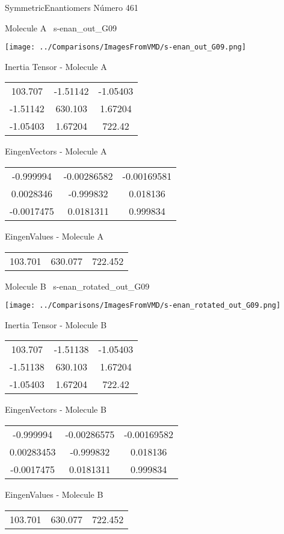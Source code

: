 \vtab[-3cm]
\begin{center}
{\large SymmetricEnantiomers \tab Número 461}
\end{center}
\begin{multicols}{2}
\begin{center}

Molecule A \
s-enan\_out\_G09

\texttt{[image: ../Comparisons/ImagesFromVMD/s-enan\_out\_G09.png]}

Inertia Tensor - Molecule A \\
\begin{tabular}{|c c c|}
103.707	 & 	-1.51142	 & 	-1.05403	 \\
-1.51142	 & 	630.103	 & 	1.67204	 \\
-1.05403	 & 	1.67204	 & 	722.42
\end{tabular}

\vtab
 EingenVectors - Molecule A     \\
\begin{tabular}{|c c c|}
-0.999994	 & 	-0.00286582	 & 	-0.00169581	 \\
0.0028346	 & 	-0.999832	 & 	0.018136	 \\
-0.0017475	 & 	0.0181311	 & 	0.999834
\end{tabular}

\vtab
 EingenValues - Molecule A     \\
\begin{tabular}{|c c c|}
103.701	 & 	630.077	 & 	722.452	 \\
\end{tabular}
\columnbreak

Molecule B \
s-enan\_rotated\_out\_G09

\texttt{[image: ../Comparisons/ImagesFromVMD/s-enan\_rotated\_out\_G09.png]}

Inertia Tensor - Molecule B \\
\begin{tabular}{|c c c|}
103.707	 & 	-1.51138	 & 	-1.05403	 \\
-1.51138	 & 	630.103	 & 	1.67204	 \\
-1.05403	 & 	1.67204	 & 	722.42
\end{tabular}

\vtab
 EingenVectors - Molecule B     \\
\begin{tabular}{|c c c|}
-0.999994	 & 	-0.00286575	 & 	-0.00169582	 \\
0.00283453	 & 	-0.999832	 & 	0.018136	 \\
-0.0017475	 & 	0.0181311	 & 	0.999834
\end{tabular}

\vtab
 EingenValues - Molecule B     \\
\begin{tabular}{|c c c|}
103.701	 & 	630.077	 & 	722.452	 \\
\end{tabular}

\end{center}
\end{multicols}

